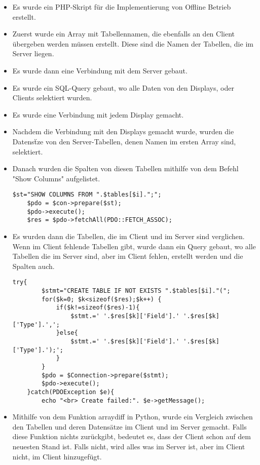 \begin{itemize}
	\item Es wurde ein PHP-Skript f\"ur die Implementierung von Offline Betrieb erstellt.
	\item Zuerst wurde ein Array mit Tabellennamen, die ebenfalls an den Client übergeben werden müssen erstellt. Diese sind die Namen der Tabellen, die im Server liegen.
	\item Es wurde dann eine Verbindung mit dem Server gebaut.
	\item Es wurde ein SQL-Query gebaut, wo alle Daten von den Displays, oder Clients selektiert wurden.
	\item Es wurde eine Verbindung mit jedem Display gemacht.
	\item Nachdem die Verbindung mit den Displays gemacht wurde, wurden die Datens\"tze von den Server-Tabellen, denen Namen im ersten Array sind, selektiert.
	\item Danach wurden die Spalten von diesen Tabellen mithilfe von dem Befehl "Show Columns" aufgelistet.
	\begin{lstlisting}[frame=single]
	$st="SHOW COLUMNS FROM ".$tables[$i].";";
	$pdo = $con->prepare($st);
	$pdo->execute();
	$res = $pdo->fetchAll(PDO::FETCH_ASSOC);
	\end{lstlisting}
	\item Es wurden dann die Tabellen, die im Client und im Server sind verglichen. Wenn im Client fehlende Tabellen gibt, wurde dann ein Query gebaut, wo alle Tabellen die im Server sind, aber im Client fehlen, erstellt werden und die Spalten auch.
	 \begin{lstlisting}[frame=single]
	 try{
	 	$stmt="CREATE TABLE IF NOT EXISTS ".$tables[$i]."(";
	 	for($k=0; $k<sizeof($res);$k++) {
	 		if($k!=sizeof($res)-1){
	 			$stmt.=' '.$res[$k]['Field'].' '.$res[$k]['Type'].',';
	 		}else{
	 			$stmt.=' '.$res[$k]['Field'].' '.$res[$k]['Type'].');';
	 		}
	 	}
	 	$pdo = $Connection->prepare($stmt);
	 	$pdo->execute();
	}catch(PDOException $e){
	 	echo "<br> Create failed:". $e->getMessage();
	 \end{lstlisting}
	 \item Mithilfe von dem Funktion arraydiff in Python, wurde ein Vergleich zwischen den Tabellen und deren Datens\"atze im Client und im Server gemacht. Falls diese Funktion nichts zur\"uckgibt, bedeutet es, dass der Client schon auf dem neuesten Stand ist. Falls nicht, wird alles was im Server ist, aber im Client nicht, im Client hinzugef\"ugt.
\end{itemize}
